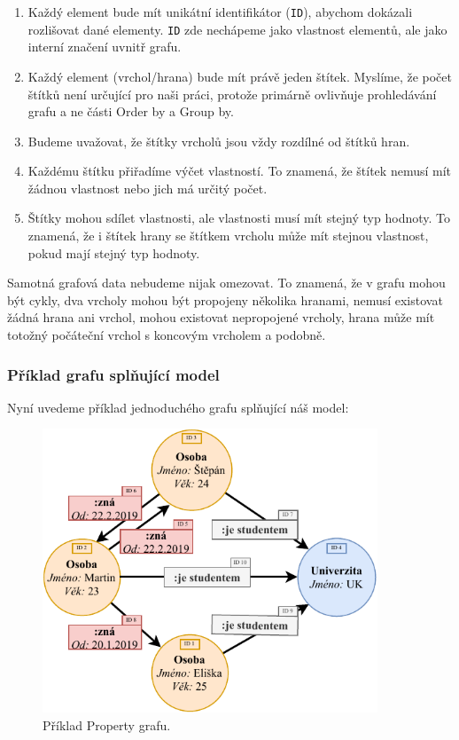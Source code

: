 \begin{enumerate}

\item
Každý element bude mít unikátní identifikátor (\texttt{ID}), abychom dokázali rozlišovat dané elementy.
\texttt{ID} zde nechápeme jako vlastnost elementů, ale jako interní značení uvnitř grafu.

\item
Každý element (vrchol/hrana) bude mít právě jeden štítek.
Myslíme, že počet štítků není určující pro naši práci, protože primárně ovlivňuje prohledávání grafu a ne části Order by a Group by.

\item
Budeme uvažovat, že štítky vrcholů jsou vždy rozdílné od štítků hran.

\item
Každému štítku přiřadíme výčet vlastností.
To znamená, že štítek nemusí mít žádnou vlastnost nebo jich má určitý počet.

\item
Štítky mohou sdílet vlastnosti, ale vlastnosti musí mít stejný typ hodnoty.
To znamená, že i štítek hrany se štítkem vrcholu může mít stejnou vlastnost, pokud mají stejný typ hodnoty.

\end{enumerate}

Samotná grafová data nebudeme nijak omezovat.
To znamená, že v grafu mohou být cykly, dva vrcholy mohou být propojeny několika hranami, nemusí existovat žádná hrana ani vrchol, mohou existovat nepropojené vrcholy, hrana může mít totožný počáteční vrchol s koncovým vrcholem a podobně.

\subsubsection{Příklad grafu splňující model}
Nyní uvedeme příklad jednoduchého grafu splňující náš model:

\begin{figure}[!htp]
\includegraphics[width=100mm]{../img/propertyexample.pdf}\centering
\caption{Příklad Property grafu.}
\label{figure.propertygraphexample}
\end{figure}

